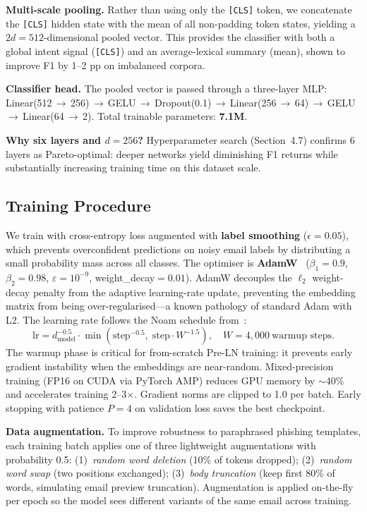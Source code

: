 \documentclass[sigconf, nonacm]{acmart}
\begin{document}
\textbf{Multi-scale pooling.}
Rather than using only the \texttt{[CLS]} token, we concatenate the
\texttt{[CLS]} hidden state with the mean of all non-padding token
states, yielding a $2d=512$-dimensional pooled vector.
This provides the classifier with both a global intent signal
(\texttt{[CLS]}) and an average-lexical summary (mean), shown to
improve F1 by 1--2 pp on imbalanced corpora.

\textbf{Classifier head.}
The pooled vector is passed through a three-layer MLP:
Linear(512\,$\to$\,256)\,$\to$\,GELU\,$\to$\,Dropout(0.1)\,$\to$\,Linear(256\,$\to$\,64)\,$\to$\,GELU\,$\to$\,Linear(64\,$\to$\,2).
Total trainable parameters: \textbf{7.1M}.

\textbf{Why six layers and $d{=}256$?}
Hyperparameter search (Section~4.7) confirms 6 layers as
Pareto-optimal: deeper networks yield diminishing F1 returns while
substantially increasing training time on this dataset scale.

\subsection{Training Procedure}

We train with cross-entropy loss augmented with \textbf{label
smoothing} ($\epsilon=0.05$), which prevents overconfident predictions
on noisy email labels by distributing a small probability mass across
all classes.
The optimiser is \textbf{AdamW}~\cite{loshchilov2019}
($\beta_1=0.9$, $\beta_2=0.98$, $\varepsilon=10^{-9}$,
weight\_decay$=0.01$).
AdamW decouples the $\ell_2$ weight-decay penalty from the adaptive
learning-rate update, preventing the embedding matrix from being
over-regularised---a known pathology of standard Adam with L2.
The learning rate follows the Noam schedule from~\cite{vaswani2017}:
\begin{equation}
\mathrm{lr}=d_\text{model}^{-0.5}
  \cdot\min\!\left(\mathrm{step}^{-0.5},\;
                   \mathrm{step}\cdot W^{-1.5}\right),
  \quad W=4{,}000\ \text{warmup steps}.
\label{eq:noam}
\end{equation}
The warmup phase is critical for from-scratch Pre-LN training: it
prevents early gradient instability when the embeddings are
near-random.
Mixed-precision training (FP16 on CUDA via PyTorch AMP) reduces
GPU memory by $\sim$40\% and accelerates training 2--3$\times$.
Gradient norms are clipped to 1.0 per batch.
Early stopping with patience $P=4$ on validation loss saves the
best checkpoint.

\textbf{Data augmentation.}
To improve robustness to paraphrased phishing templates, each training
batch applies one of three lightweight augmentations with probability
0.5: (1)~\emph{random word deletion} (10\% of tokens dropped);
(2)~\emph{random word swap} (two positions exchanged);
(3)~\emph{body truncation} (keep first 80\% of words, simulating
email preview truncation).
Augmentation is applied on-the-fly per epoch so the model sees
different variants of the same email across training.
\end{document}
